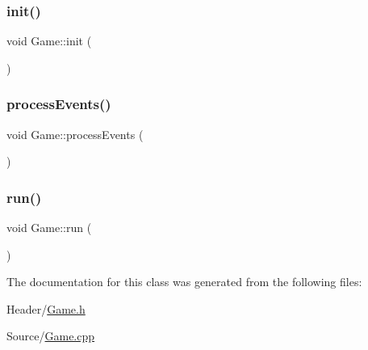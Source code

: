 \subsubsection{\texorpdfstring{init()}{init()}}
{\footnotesize\ttfamily void Game\+::init (\begin{DoxyParamCaption}{ }\end{DoxyParamCaption})}

\mbox{\label{class_game_a79f698dda206dd7a9bed28b3f88bdc38}} 
\subsubsection{\texorpdfstring{processEvents()}{processEvents()}}
{\footnotesize\ttfamily void Game\+::process\+Events (\begin{DoxyParamCaption}{ }\end{DoxyParamCaption})}

\mbox{\label{class_game_a1ab78f5ed0d5ea879157357cf2fb2afa}} 
\subsubsection{\texorpdfstring{run()}{run()}}
{\footnotesize\ttfamily void Game\+::run (\begin{DoxyParamCaption}{ }\end{DoxyParamCaption})}



The documentation for this class was generated from the following files\+:\begin{DoxyCompactItemize}
\item 
Header/\mbox{\hyperlink{_game_8h}{Game.\+h}}\item 
Source/\mbox{\hyperlink{_game_8cpp}{Game.\+cpp}}\end{DoxyCompactItemize}
